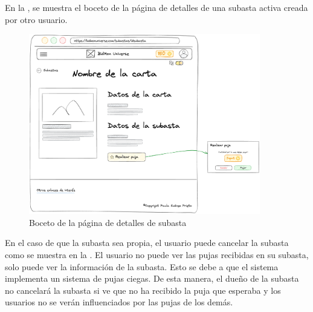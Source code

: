 En la ,
se muestra el boceto de la página de detalles de una subasta activa creada por otro usuario.
\begin{figure}[H]
    \centering
    \includegraphics[width=0.9\textwidth]{figures/6-Analisis/6-Interfaz/prototipos/detalle-subasta.png}
    \caption{Boceto de la página de detalles de subasta}
    \label{fig:p_auction_details}
    \hypertarget{fig:p_auction_details}{}
\end{figure}

En el caso de que la subasta sea propia, el usuario puede cancelar la subasta como se muestra en la .
El usuario no puede ver las pujas recibidas en su subasta, solo puede ver la información de la subasta. Esto se debe a que el sistema implementa un sistema de pujas ciegas.
De esta manera, el dueño de la subasta no cancelará la subasta si ve que no ha recibido la puja que esperaba y los usuarios no se verán influenciados por las pujas de los demás.

